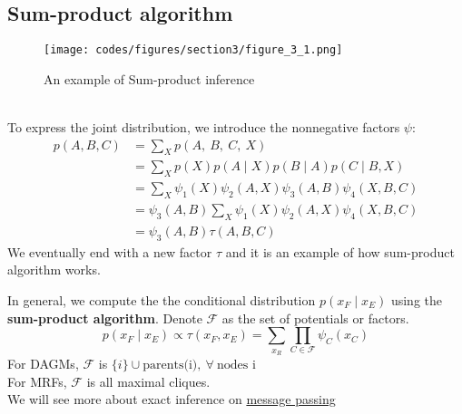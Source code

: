 \subsection{Sum-product algorithm}
\label{sec:sum-product}
\begin{example}
    \begin{figure}[H]
        \centering
        \texttt{[image: codes/figures/section3/figure\_3\_1.png]}
        \caption{An example of Sum-product inference}
        \label{fig:sum-product}
    \end{figure}
    \text{}\\
    To express the joint distribution, we introduce the nonnegative factors $\psi$: 
    \begin{align*}
        p(A, B, C) & =\sum_X p(A,\:B,\:C,\:X)\\
        & =\sum_X p(X) p(A \mid X) p(B \mid A) p(C \mid B, X) \\
        & =\sum_X \psi_1(X) \psi_2(A, X) \psi_3(A, B) \psi_4(X, B, C) \\
        & =\psi_3(A, B) \sum_X \psi_1(X) \psi_2(A, X) \psi_4(X, B, C) \\
        & =\psi_3(A, B) \tau(A, B, C)
    \end{align*}
    We eventually end with a new factor $\tau$ and it is an example of how sum-product algorithm works.
\end{example}
In general, we compute the the conditional distribution $p(x_F\mid x_E)$ using the \textbf{sum-product algorithm}. Denote $\mathcal{F}$ as the set of potentials or factors.
$$p\left(x_F \mid x_E\right) \propto \tau\left(x_F, x_E\right)=\sum_{x_R} \prod_{C \in \mathcal{F}} \psi_C\left(x_C\right)$$
For DAGMs, $\mathcal{F}$ is $\{i\}\cup\text{parents(i)},\:\forall\:\text{nodes i}$\\
For MRFs, $\mathcal{F}$ is all maximal cliques.\\
\newline
We will see more about exact inference on \hyperref[sec:message-passing]{message passing}
